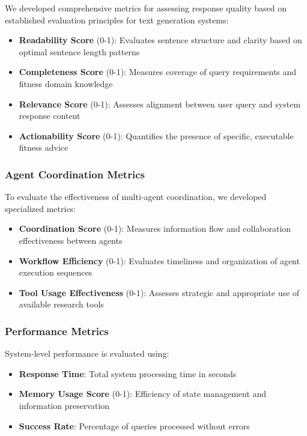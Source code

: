 \documentclass[conference]{IEEEtran}
\begin{document}
We developed comprehensive metrics for assessing response quality based on established evaluation principles for text generation systems:

\begin{itemize}
\item \textbf{Readability Score} (0-1): Evaluates sentence structure and clarity based on optimal sentence length patterns
\item \textbf{Completeness Score} (0-1): Measures coverage of query requirements and fitness domain knowledge
\item \textbf{Relevance Score} (0-1): Assesses alignment between user query and system response content
\item \textbf{Actionability Score} (0-1): Quantifies the presence of specific, executable fitness advice
\end{itemize}

\subsubsection{Agent Coordination Metrics}

To evaluate the effectiveness of multi-agent coordination, we developed specialized metrics:

\begin{itemize}
\item \textbf{Coordination Score} (0-1): Measures information flow and collaboration effectiveness between agents
\item \textbf{Workflow Efficiency} (0-1): Evaluates timeliness and organization of agent execution sequences
\item \textbf{Tool Usage Effectiveness} (0-1): Assesses strategic and appropriate use of available research tools
\end{itemize}

\subsubsection{Performance Metrics}

System-level performance is evaluated using:

\begin{itemize}
\item \textbf{Response Time}: Total system processing time in seconds
\item \textbf{Memory Usage Score} (0-1): Efficiency of state management and information preservation
\item \textbf{Success Rate}: Percentage of queries processed without errors
\end{itemize}
\end{document}
